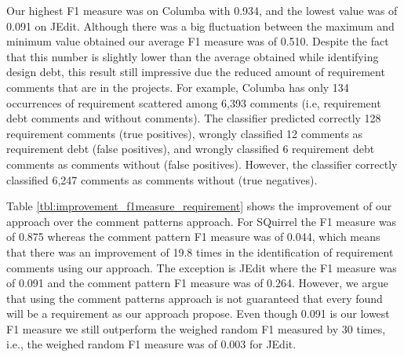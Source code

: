 Our highest F1 measure was on Columba with 0.934, and the lowest value was of 0.091 on JEdit. Although there was a big fluctuation between the maximum and minimum value obtained our average F1 measure was of 0.510. Despite the fact that this number is slightly lower than the average obtained while  identifying design debt, this result still impressive due the reduced amount of requirement \SATD comments that are in the projects. For example, Columba has only 134 occurrences of requirement \SATD scattered among 6,393 comments (i.e, requirement debt comments and without \SATD comments). The classifier predicted correctly 128 requirement \SATD comments (true positives), wrongly classified 12 comments as requirement debt (false positives), and wrongly classified 6 requirement debt comments as comments without \SATD (false positives). However, the classifier correctly classified 6,247 comments as comments without \SATD (true negatives).

Table \ref{tbl:improvement_f1measure_requirement} shows the improvement of our approach over the comment patterns approach. For SQuirrel the F1 measure was of 0.875 whereas the comment pattern F1 measure was of 0.044, which means that there was an improvement of 19.8 times in the identification of requirement \SATD comments using our approach. The exception is JEdit where the F1 measure was of 0.091 and the comment pattern F1 measure was of 0.264. However, we argue that using the comment patterns approach is not guaranteed that every \SATD found will be a requirement \SATD as our approach propose. Even though 0.091 is our lowest F1 measure we still outperform the weighed random F1 measured by 30 times, i.e., the weighed random F1 measure was of 0.003 for JEdit. 


